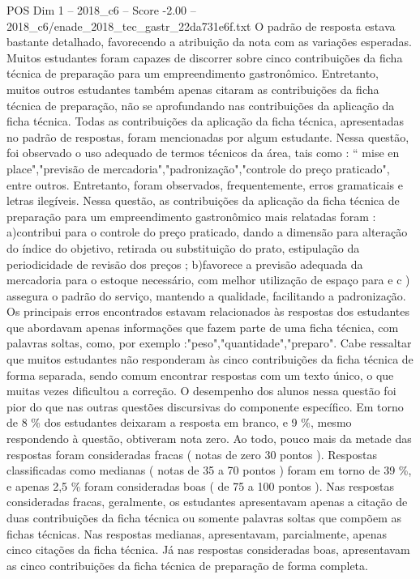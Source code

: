 \begin{textsample}{POS Dim 1 – 2018\_c6 – Score -2.00 – 2018\_c6/enade\_2018\_tec\_gastr\_22da731e6f.txt}
O padrão de resposta estava bastante detalhado, favorecendo a atribuição da nota com as variações esperadas.
Muitos estudantes foram capazes de discorrer sobre cinco contribuições da ficha técnica de preparação para um empreendimento gastronômico.
Entretanto, muitos outros estudantes também apenas citaram as contribuições da ficha técnica de preparação, não se aprofundando nas contribuições da aplicação da ficha técnica.
Todas as contribuições da aplicação da ficha técnica, apresentadas no padrão de respostas, foram mencionadas por algum estudante.
Nessa questão, foi observado o uso adequado de termos técnicos da área, tais como : “ mise en place","previsão de mercadoria","padronização","controle do preço praticado", entre outros.
Entretanto, foram observados, frequentemente, erros gramaticais e letras ilegíveis.
Nessa questão, as contribuições da aplicação da ficha técnica de preparação para um empreendimento gastronômico mais relatadas foram : a)contribui para o controle do preço praticado, dando a dimensão para alteração do índice do objetivo, retirada ou substituição do prato, estipulação da periodicidade de revisão dos preços ; b)favorece a previsão adequada da mercadoria para o estoque necessário, com melhor utilização de espaço para e c ) assegura o padrão do serviço, mantendo a qualidade, facilitando a padronização.
Os principais erros encontrados estavam relacionados às respostas dos estudantes que abordavam apenas informações que fazem parte de uma ficha técnica, com palavras soltas, como, por exemplo :"peso","quantidade","preparo".
Cabe ressaltar que muitos estudantes não responderam às cinco contribuições da ficha técnica de forma separada, sendo comum encontrar respostas com um texto único, o que muitas vezes dificultou a correção.
O desempenho dos alunos nessa questão foi pior do que nas outras questões discursivas do componente específico.
Em torno de 8 \% dos estudantes deixaram a resposta em branco, e 9 \%, mesmo respondendo à questão, obtiveram nota zero.
Ao todo, pouco mais da metade das respostas foram consideradas fracas ( notas de zero 30 pontos ).
Respostas classificadas como medianas ( notas de 35 a 70 pontos ) foram em torno de 39 \%, e apenas 2,5 \% foram consideradas boas ( de 75 a 100 pontos ).
Nas respostas consideradas fracas, geralmente, os estudantes apresentavam apenas a citação de duas contribuições da ficha técnica ou somente palavras soltas que compõem as fichas técnicas.
Nas respostas medianas, apresentavam, parcialmente, apenas cinco citações da ficha técnica.
Já nas respostas consideradas boas, apresentavam as cinco contribuições da ficha técnica de preparação de forma completa.

\end{textsample}
